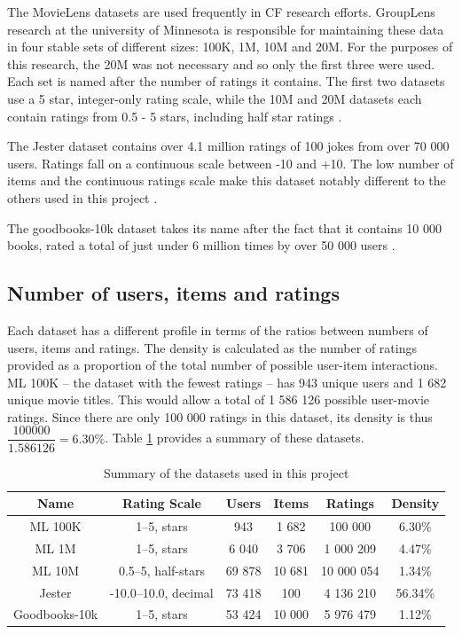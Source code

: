The MovieLens datasets are used frequently in CF research efforts. GroupLens research at the university of Minnesota is responsible for maintaining these data in four stable sets of different sizes: 100K, 1M, 10M and 20M. For the purposes of this research, the 20M was not necessary and so only the first three were used. Each set is named after the number of ratings it contains. The first two datasets use a 5 star, integer-only rating scale, while the 10M and 20M datasets each contain ratings from 0.5 - 5 stars, including half star ratings \parencite{harper2016movielens}.

The Jester dataset contains over 4.1 million ratings of 100 jokes from over 70 000 users. Ratings fall on a continuous scale between -10 and +10. The low number of items and the continuous ratings scale make this dataset notably different to the others used in this project \parencite{cf_1.2_eigentaste}.

The goodbooks-10k dataset takes its name after the fact that it contains 10 000 books, rated a total of just under 6 million times by over 50 000 users \parencite{goodbooks2017}.

\subsection{Number of users, items and ratings}
Each dataset has a different profile in terms of the ratios between numbers of users, items and ratings. The density is calculated as the number of ratings provided as a proportion of the total number of possible user-item interactions. ML 100K -- the dataset with the fewest ratings -- has 943 unique users and 1 682 unique movie titles. This would allow a total of 1 586 126 possible user-movie ratings. Since there are only 100 000 ratings in this dataset, its density is thus $\dfrac{100000}{1.586126} = 6.30\%$. Table \ref{tab:data-summary} provides a summary of these datasets. 

\begin{table}[H]
\caption[Data summary]{Summary of the datasets used in this project}
\label{tab:data-summary}
\centering
\begin{tabular}{c | c | c | c | c | c}
\toprule
\textbf{Name} & \textbf{Rating Scale} & \textbf{Users} & \textbf{Items} & \textbf{Ratings} & \textbf{Density} \\
\midrule
ML 100K & 1--5, stars & 943 & 1 682 & 100 000 & 6.30\% \\
ML 1M & 1--5, stars & 6 040 & 3 706 & 1 000 209 & 4.47\% \\
ML 10M & 0.5--5, half-stars & 69 878 & 10 681 & 10 000 054 & 1.34\% \\
Jester & -10.0--10.0, decimal & 73 418 & 100 & 4 136 210 & 56.34\% \\
Goodbooks-10k & 1--5, stars & 53 424 & 10 000 & 5 976 479 & 1.12\% \\
\bottomrule
\end{tabular}
\end{table}

